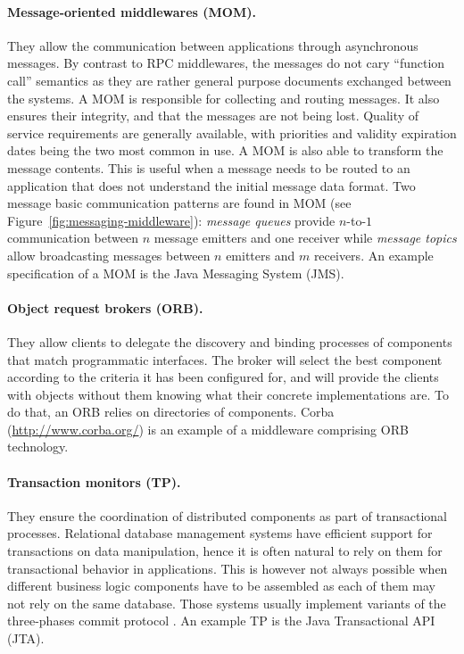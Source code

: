 \paragraph{Message-oriented middlewares (MOM).}
They allow the communication between applications through asynchronous messages. By contrast to RPC middlewares, the messages do not cary ``function call'' semantics as they are rather general purpose documents exchanged between the systems. A MOM is responsible for collecting and routing messages. It also ensures their integrity, and that the messages are not being lost. Quality of service requirements are generally available, with priorities and validity expiration dates being the two most common in use. A MOM is also able to transform the message contents. This is useful when a message needs to be routed to an application that does not understand the initial message data format.
Two message basic communication patterns are found in MOM (see Figure~\ref{fig:messaging-middleware}): \emph{message queues} provide $n$-to-$1$ communication between $n$ message emitters and one receiver while \emph{message topics} allow broadcasting messages between $n$ emitters and $m$ receivers. An example specification of a MOM is the Java Messaging System (JMS).
  
\paragraph{Object request brokers (ORB).}
They allow clients to delegate the discovery and binding processes of components that match programmatic interfaces. The broker will select the best component according to the criteria it has been configured for, and will provide the clients with objects without them knowing what their concrete implementations are. To do that, an ORB relies on directories of components. Corba (\url{http://www.corba.org/}) is an example of a middleware comprising ORB technology.

\paragraph{Transaction monitors (TP).}
They ensure the coordination of distributed components as part of transactional processes. Relational database management systems have efficient support for transactions on data manipulation, hence it is often natural to rely on them for transactional behavior in applications. This is however not always possible when different business logic components have to be assembled as each of them may not rely on the same database. Those systems usually implement variants of the three-phases commit protocol \cite{SkeenS83}. An example TP is the Java Transactional API (JTA).
  
